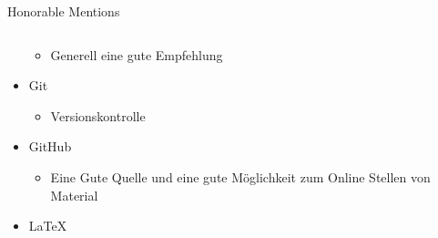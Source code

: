 \documentclass[aspectratio=169,shownotes]{beamer}
\begin{document}
\begin{frame}{Honorable Mentions}
\begin{columns}[t]
\begin{column}{0.6\textwidth}
\begin{itemize}
                \begin{itemize}
                    \item Generell eine gute Empfehlung
                \end{itemize}  
                \item Git
                \begin{itemize}
                    \item Versionskontrolle
                \end{itemize}  
                \item GitHub
                \begin{itemize}
                    \item Eine Gute Quelle und eine gute Möglichkeit zum Online Stellen von Material
                \end{itemize} 
                \item \LaTeX  
            \end{itemize}
        \end{column}
    \end{columns}
\end{frame}
\end{document}

